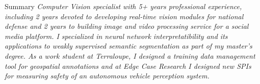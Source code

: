 \documentclass[]{mcdowellcv}
\begin{document}
    \makeheader
    
    \begin{cvsection}{Summary}
    \textit{Computer Vision specialist with 5+ years professional experience, including 2 years devoted to developing real-time vision modules for national defense and 2 years to building image and video processing service for a social media platform. I specialized in neural network interpretatibility and its applications to weakly supervised semantic segmentation as part of my master's degree. As a work student at Terraloupe, I designed a training data management tool for geospatial annotations and at Edge Case Research I designed new SPIs for measuring safety of an autonomous vehicle perception system.}
    \end{cvsection}
    
\end{document}
